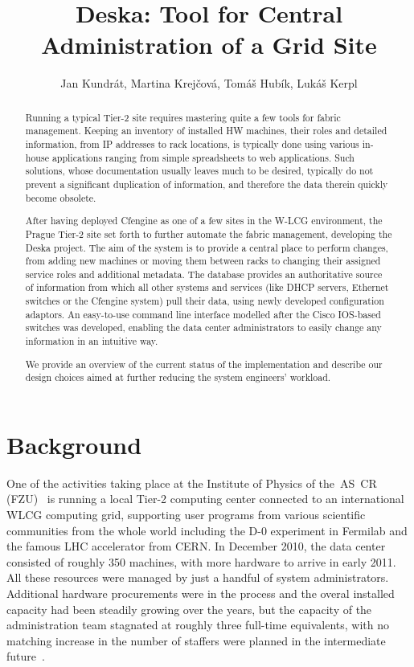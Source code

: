 \documentclass[a4paper]{jpconf}
\begin{document}
\title{Deska: Tool for Central Administration of a Grid Site}
\author{Jan Kundrát, Martina Krejčová, Tomáš Hubík, Lukáš Kerpl}
\address{Institute of Physics, AS CR, Na Slovance 22, 182 21, Prague, Czech
Republic}

\begin{abstract}
Running a typical Tier-2 site requires mastering quite a few tools for fabric management. Keeping an inventory of installed HW
machines, their roles and detailed information, from IP addresses to rack locations, is typically done using various in-house
applications ranging from simple spreadsheets to web applications. Such solutions, whose documentation usually leaves much to be
desired, typically do not prevent a significant duplication of information, and therefore the data therein quickly become obsolete.

After having deployed Cfengine as one of a few sites in the W-LCG environment, the Prague Tier-2 site set forth to further automate the
fabric management, developing the Deska project. The aim of the system is to provide a central place to perform changes, from adding
new machines or moving them between racks to changing their assigned service roles and additional metadata. The database provides an
authoritative source of information from which all other systems and services (like DHCP servers, Ethernet switches or the Cfengine
system) pull their data, using newly developed configuration adaptors. An easy-to-use command line interface modelled after the Cisco
IOS-based switches was developed, enabling the data center administrators to easily change any information in an intuitive way.

We provide an overview of the current status of the implementation and describe our design choices aimed at further reducing the system
engineers' workload.
\end{abstract}

\section{Background}

One of the activities taking place at the Institute of Physics of the~AS~CR (FZU)~\cite{fzu} is running a local Tier-2 computing center
connected to an international WLCG computing grid, supporting user programs from various scientific communities from the whole world
including the D-0 experiment in Fermilab and the famous LHC accelerator from CERN.  In December 2010, the data center consisted of
roughly 350 machines, with more hardware to arrive in early 2011.  All these resources were managed by just a handful of system
administrators.  Additional hardware procurements were in the process and the overal installed capacity had been steadily growing over
the years, but the capacity of the administration team stagnated at roughly three full-time equivalents, with no matching increase in
the number of staffers were planned in the intermediate future~\cite{dubna-kundrat}.
\end{document}
